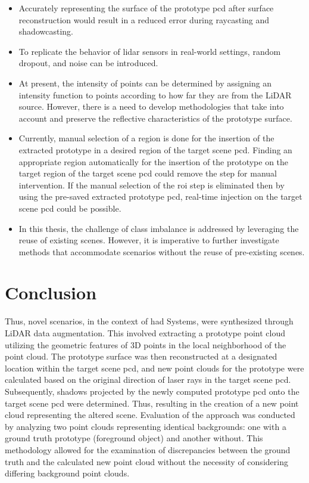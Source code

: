 \begin{itemize}
    \item Accurately representing the surface of the prototype \acrshort{pcd} after surface reconstruction would result in a reduced error during raycasting and shadowcasting.
    \item To replicate the behavior of lidar sensors in real-world settings, random dropout, and noise can be introduced.
    \item At present, the intensity of points can be determined by assigning an intensity function to points according to how far they are from the LiDAR source. However, there is a need to develop methodologies that take into account and preserve the reflective characteristics of the prototype surface.
    \item Currently, manual selection of a region is done for the insertion of the extracted prototype in a desired region of the target scene \acrshort{pcd}. Finding an appropriate region automatically for the insertion of the prototype on the target region of the target scene \acrshort{pcd} could remove the step for manual intervention. If the manual selection of the \acrshort{roi} step is eliminated then by using the pre-saved extracted prototype \acrshort{pcd}, real-time injection on the target scene \acrshort{pcd} could be possible.
    \item In this thesis, the challenge of class imbalance is addressed by leveraging the reuse of existing scenes. However, it is imperative to further investigate methods that accommodate scenarios without the reuse of pre-existing scenes.
\end{itemize}

\section{Conclusion}
Thus, novel scenarios, in the context of \acrfull{had} Systems, were synthesized through LiDAR data augmentation. This involved extracting a prototype point cloud utilizing the geometric features of 3D points in the local neighborhood of the point cloud. The prototype surface was then reconstructed at a designated location within the target scene \acrshort{pcd}, and new point clouds for the prototype were calculated based on the original direction of laser rays in the target scene \acrshort{pcd}. Subsequently, shadows projected by the newly computed prototype \acrshort{pcd} onto the target scene \acrshort{pcd} were determined. Thus, resulting in the creation of a new point cloud representing the altered scene. Evaluation of the approach was conducted by analyzing two point clouds representing identical backgrounds: one with a ground truth prototype (foreground object) and another without. This methodology allowed for the examination of discrepancies between the ground truth and the calculated new point cloud without the necessity of considering differing background point clouds. 

